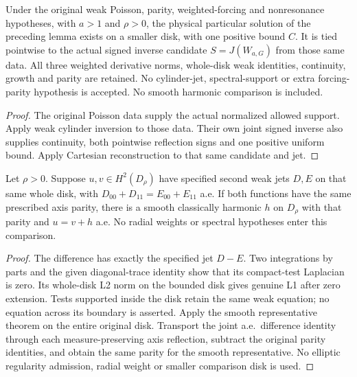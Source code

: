 \begin{lemma}
\label{lem:cylinder-forcing-particular}
\leanok
Under the original weak Poisson, parity, weighted-forcing and nonresonance
hypotheses, with $a>1$ and $\rho>0$, the physical particular solution of the
preceding lemma exists on a smaller disk, with one positive bound $C$.
It is tied pointwise to the actual signed inverse candidate
$S=J(W_{a,G})$ from those same data. All three weighted derivative norms,
whole-disk weak identities, continuity, growth and parity are retained.
No cylinder-jet, spectral-support or extra forcing-parity hypothesis is accepted.
No smooth harmonic comparison is included.
\end{lemma}

\begin{proof}
\leanok
The original Poisson data supply the actual normalized allowed support.
Apply weak cylinder inversion to those data. Their own joint signed inverse
also supplies continuity, both pointwise reflection signs and one positive
uniform bound. Apply Cartesian reconstruction to that same candidate and jet.
\end{proof}

\begin{lemma}
\label{lem:weak-poisson-harmonic-comparison}
\leanok
Let $\rho>0$. Suppose $u,v\in H^2(D_\rho)$ have specified second weak jets
$D,E$ on that same whole disk, with
$D_{00}+D_{11}=E_{00}+E_{11}$ a.e.
If both functions have the same prescribed axis parity, there is a smooth
classically harmonic $h$ on $D_\rho$ with that parity and $u=v+h$ a.e.
No radial weights or spectral hypotheses enter this comparison.
\end{lemma}

\begin{proof}
\leanok
The difference has exactly the specified jet $D-E$.
Two integrations by parts and the given diagonal-trace identity show that
its compact-test Laplacian is zero.
Its whole-disk L2 norm on the bounded disk gives genuine L1 after zero
extension. Tests supported inside the disk retain the same weak equation;
no equation across its boundary is asserted.
Apply the smooth representative theorem on the entire original disk.
Transport the joint a.e.\ difference identity through each measure-preserving
axis reflection, subtract the original parity identities, and obtain the
same parity for the smooth representative.
No elliptic regularity admission, radial weight or smaller comparison disk
is used.
\end{proof}

